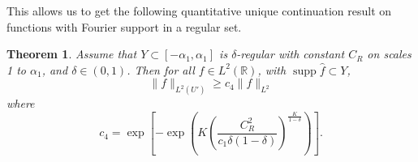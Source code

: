 \documentclass[reqno,12pt,letterpaper]{amsart}
\newtheorem{thm}[prop]{Theorem}
\numberwithin{equation}{section}
\numberwithin{prop}{section}
\DeclareMathOperator{\supp}{supp}
\begin{document}

This allows us to get the following quantitative unique continuation result on functions with Fourier support in a regular set.


\begin{thm}
Assume that $Y\subset[-\alpha_1,\alpha_1]$ is $\delta$-regular with constant $C_R$ on scales 1 to $\alpha_1$, and $\delta\in(0,1)$. Then for all $f\in L^2(\mathbb{R})$, with $\supp\widehat{f}\subset Y$,
\begin{equation}
\|f\|_{L^2(U')}\geq c_4\|f\|_{L^2}
\end{equation}
where
\begin{equation}
\label{e:iterimprove}
c_4=\exp\left[-\exp\left(K\left(\frac{C_R^2}{c_1\delta(1-\delta)}\right)^{\frac{K}{1-\delta}}\right)\right].
\end{equation}
\end{thm}
\end{document}
